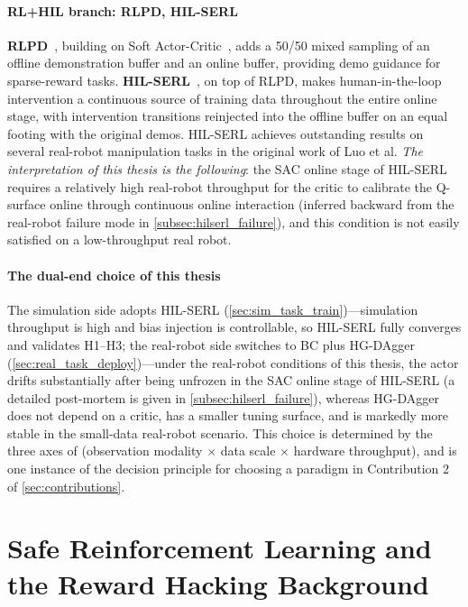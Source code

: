 \paragraph{RL+HIL branch: RLPD, HIL-SERL} \textbf{RLPD}~\cite{ball2023rlpd}, building on Soft Actor-Critic~\cite{haarnoja2018sac}, adds a 50/50 mixed sampling of an offline demonstration buffer and an online buffer, providing demo guidance for sparse-reward tasks. \textbf{HIL-SERL}~\cite{luo2025hilserl}, on top of RLPD, makes human-in-the-loop intervention a continuous source of training data throughout the entire online stage, with intervention transitions reinjected into the offline buffer on an equal footing with the original demos. HIL-SERL achieves outstanding results on several real-robot manipulation tasks in the original work of Luo et al. \emph{The interpretation of this thesis is the following}: the SAC online stage of HIL-SERL requires a relatively high real-robot throughput for the critic to calibrate the Q-surface online through continuous online interaction (inferred backward from the real-robot failure mode in \cref{subsec:hilserl_failure}), and this condition is not easily satisfied on a low-throughput real robot.

\paragraph{The dual-end choice of this thesis} The simulation side adopts HIL-SERL (\cref{sec:sim_task_train})---simulation throughput is high and bias injection is controllable, so HIL-SERL fully converges and validates H1--H3; the real-robot side switches to BC plus HG-DAgger (\cref{sec:real_task_deploy})---under the real-robot conditions of this thesis, the actor drifts substantially after being unfrozen in the SAC online stage of HIL-SERL (a detailed post-mortem is given in \cref{subsec:hilserl_failure}), whereas HG-DAgger does not depend on a critic, has a smaller tuning surface, and is markedly more stable in the small-data real-robot scenario. This choice is determined by the three axes of (observation modality $\times$ data scale $\times$ hardware throughput), and is one instance of the decision principle for choosing a paradigm in Contribution 2 of \cref{sec:contributions}.

\section{Safe Reinforcement Learning and the Reward Hacking Background}\label{sec:safe_rl}

